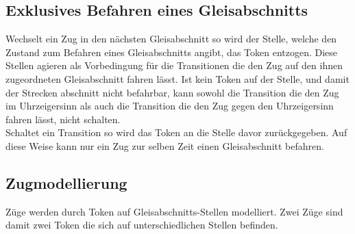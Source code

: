 \documentclass[10pt]{scrartcl}
\begin{document}
\subsection{Exklusives Befahren eines Gleisabschnitts}
Wechselt ein Zug in den nächsten Gleisabschnitt so wird der Stelle, welche den Zustand zum Befahren eines Gleisabschnitts angibt, das Token entzogen.
Diese Stellen agieren als Vorbedingung für die Transitionen die den Zug auf den ihnen zugeordneten Gleisabschnitt fahren lässt.
Ist kein Token auf der Stelle, und damit der Strecken abschnitt nicht befahrbar, kann sowohl die Transition die den Zug im Uhrzeigersinn als auch die Transition die den Zug gegen den Uhrzeigersinn fahren lässt, nicht schalten.\\
Schaltet ein Transition so wird das Token an die Stelle davor zurückgegeben.
Auf diese Weise kann nur ein Zug zur selben Zeit einen Gleisabschnitt befahren.

\subsection{Zugmodellierung}
Züge werden durch Token auf Gleisabschnitts-Stellen modelliert.
Zwei Züge sind damit zwei Token die sich auf unterschiedlichen Stellen befinden. 
\end{document}
